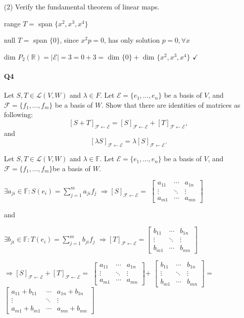 \documentclass{article}
\begin{document}
(2) Verify the fundamental theorem of linear maps.

range $T =$ span $\{x^2,x^3,x^4\}$

null $T =$ span $\{0\}$, since $x^2p = 0$, has only solution $p = 0,
\forall x$

dim $P_2(\mathbb{R}) = |\mathcal{E}| = 3 = 0 + 3 =$ dim $\{0\} +$ dim
$\{x^2,x^3,x^4\}$ $\checkmark$

\newpage
\paragraph{Q4} Let $S, T ∈ \mathcal{L}(V, W)$ and $λ ∈ F$. Let $\mathcal{E} = \{e_1 , ... , e_n\}$ be a basis
of $V$, and $\mathcal{F} = \{f_1 , ... , f_m \}$ be a basis of $W$. Show that there are identities of matrices as
following:
\[[S + T ]_{\mathcal{F} \leftarrow \mathcal{E}} = [S]_{\mathcal{F}
    \leftarrow \mathcal{E}} + [T ]_{\mathcal{F} \leftarrow \mathcal{E}},\]
and
\[[λS]_{\mathcal{F} \leftarrow \mathcal{E}} = λ[S]_{\mathcal{F}
    \leftarrow \mathcal{E}}.\]

\vspace{0.618 em}

Let $S, T ∈ \mathcal{L}(V, W)$ and $λ ∈ \mathbb{F}$. Let $\mathcal{E} = \{e_1 , ... , e_n\}$ be a basis
of $V$, and $\mathcal{F} = \{f_1 , ... , f_m \}$be a basis of $W$.

$\exists a_{ji} \in \mathbb{F}: S(e_i) = \sum_{j=1}^ma_{ji}f_j$
$\Rightarrow [S]_{\mathcal{F} \leftarrow \mathcal{E}} =
$
$\begin{bmatrix}
a_{11}&\cdots & a_{1n}\\
\vdots&\ddots&\vdots\\
a_{m1}&\cdots& a_{mn}
\end{bmatrix}
$

and

$\exists b_{ji} \in \mathbb{F}: T(e_i) = \sum_{j=1}^mb_{ji}f_j$
$\Rightarrow [T]_{\mathcal{F} \leftarrow \mathcal{E}} =
\begin{bmatrix}
b_{11}&\cdots & b_{1n}\\
\vdots&\ddots&\vdots\\
b_{m1}&\cdots& b_{mn}
\end{bmatrix}
$

$\Rightarrow [S]_{\mathcal{F} \leftarrow \mathcal{E}} + [T]_{\mathcal{F} \leftarrow \mathcal{E}} =$
$\begin{bmatrix}
a_{11}&\cdots & a_{1n}\\
\vdots&\ddots&\vdots\\
a_{m1}&\cdots& a_{mn}
\end{bmatrix}
$$ + $
$\begin{bmatrix}
b_{11}&\cdots & b_{1n}\\
\vdots&\ddots&\vdots\\
b_{m1}&\cdots& b_{mn}
\end{bmatrix}
$$ = $
$\begin{bmatrix}
a_{11} + b_{11} &\cdots & a_{1n} + b_{1n}\\
\vdots&\ddots&\vdots\\
a_{m1} + b_{m1}&\cdots& a_{mn} + b_{mn}
\end{bmatrix}
$
\end{document}
